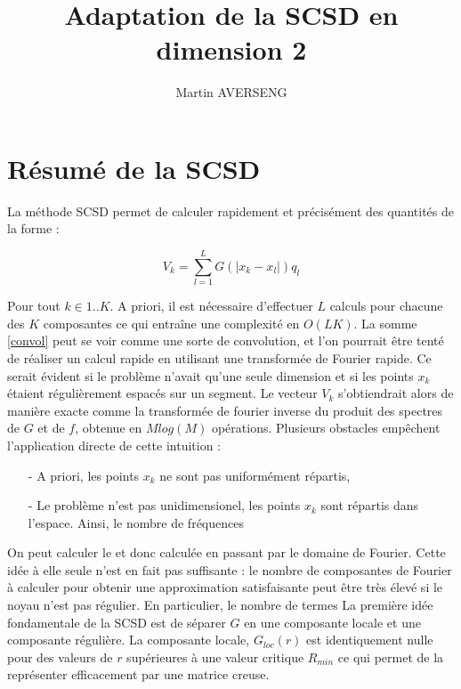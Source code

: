 \documentclass[11pt,a4paper]{article}
\author{Martin AVERSENG}
\title{Adaptation de la SCSD en dimension 2}
\begin{document}
\maketitle


\section{Résumé de la SCSD}

La méthode SCSD permet de calculer rapidement et précisément des quantités de la forme : 

\begin{equation}
V_k = \sum_{l=1}^L G(|x_k - x_l|) q_l
\label{convol}
\end{equation}

Pour tout $k \in 1..K$. A priori, il est nécessaire d'effectuer $L$ calculs pour chacune des $K$ composantes ce qui entraîne une complexité en $O(LK)$. La somme \ref{convol} peut se voir comme une sorte de convolution, et l'on pourrait être tenté de réaliser un calcul rapide en utilisant une transformée de Fourier rapide. Ce serait évident si le problème n'avait qu'une seule dimension et si les points $x_k$ étaient régulièrement espacés sur un segment. Le vecteur $V_k$ s'obtiendrait alors de manière exacte comme la transformée de fourier inverse du produit des spectres de $G$ et de $f$, obtenue en $M log(M)$ opérations. Plusieurs obstacles empêchent l'application directe de cette intuition : 
\begin{itemize}
\item[-] A priori, les points $x_k$ ne sont pas uniformément répartis, 
\item[-] Le problème n'est pas unidimensionel, les points $x_k$ sont répartis dans l'espace. Ainsi, le nombre de fréquences 
\end{itemize}

On peut calculer le  et donc calculée en passant par le domaine de Fourier. Cette idée à elle seule n'est en fait pas suffisante : le nombre de composantes de Fourier à calculer pour obtenir une approximation satisfaisante peut être très élevé si le noyau n'est pas régulier. En particulier, le nombre de termes  La première idée fondamentale de la SCSD est de séparer $G$ en une composante locale et une composante régulière. La composante locale, $G_{loc}(r)$ est identiquement nulle pour des valeurs de $r$ supérieures à une valeur critique $R_{min}$ ce qui permet de la représenter efficacement par une matrice creuse. 
\end{document}
